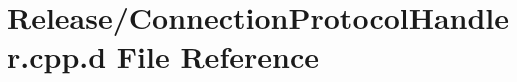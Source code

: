 \hypertarget{_release_2_connection_protocol_handler_8cpp_8d}{\section{\-Release/\-Connection\-Protocol\-Handler.cpp.\-d \-File \-Reference}
\label{_release_2_connection_protocol_handler_8cpp_8d}
}
